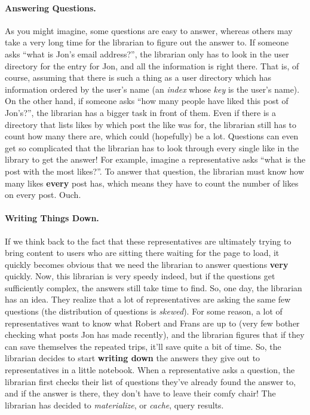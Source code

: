 \paragraph{Answering Questions.}
%
As you might imagine, some questions are easy to answer, whereas others may take
a very long time for the librarian to figure out the answer to. If someone asks
``what is Jon's email address?'', the librarian only has to look in the user
directory for the entry for Jon, and all the information is right there. That is, of
course, assuming that there is such a thing as a user directory which has
information ordered by the user's name (an \textit{index} whose \textit{key} is
the user's name). On the other hand, if someone asks ``how many people have
liked this post of Jon's?'', the librarian has a bigger task in front of them.
Even if there is a directory that lists likes by which post the like was for,
the librarian still has to count how many there are, which could (hopefully) be
a lot. Questions can even get so complicated that the librarian has to look
through every single like in the library to get the answer! For example, imagine
a representative asks ``what is the post with the most likes?''. To answer that
question, the librarian must know how many likes \textbf{every} post has, which
means they have to count the number of likes on every post. Ouch.

\paragraph{Writing Things Down.}
%
If we think back to the fact that these representatives are ultimately trying to
bring content to users who are sitting there waiting for the page to load, it
quickly becomes obvious that we need the librarian to answer questions
\textbf{very} quickly. Now, this librarian is very speedy indeed, but if the
questions get sufficiently complex, the answers still take time to find. So, one
day, the librarian has an idea. They realize that a lot of representatives are
asking the same few questions (the distribution of questions is
\textit{skewed}). For some reason, a lot of representatives want to know what
Robert and Frans are up to (very few bother checking what posts Jon has made
recently), and the librarian figures that if they can save themselves the
repeated trips, it'll save quite a bit of time. So, the librarian decides to
start \textbf{writing down} the answers they give out to representatives in a
little notebook. When a representative asks a question, the librarian first
checks their list of questions they've already found the answer to, and if the
answer is there, they don't have to leave their comfy chair! The librarian has
decided to \textit{materialize}, or \textit{cache}, query results.

